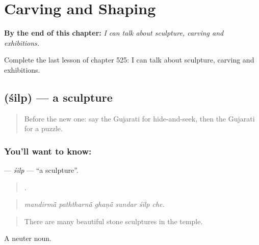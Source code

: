 
\chapter{Carving and Shaping}
\label{ch:gu-carving-and-shaping}

\begin{chapteropening}
\textbf{By the end of this chapter:} \emph{I can talk about sculpture, carving and exhibitions.}

Complete the last lesson of chapter 525: I can talk about sculpture, carving and exhibitions.
\end{chapteropening}

\section[\texorpdfstring{\gu{શિલ્પ} (śilp)}{શિલ્પ (śilp)}]{ (śilp) — a sculpture}

\label{lesson:GU-C525-silp}



\begin{quote}
Before the new one: say the Gujarati for hide-and-seek, then the Gujarati for a puzzle.
\end{quote}

\subsection*{You'll want to know: }
\textbf{} — \emph{śilp} — \textquotedblleft{}a sculpture\textquotedblright{}.

\begin{quote}
     .
\end{quote}

\begin{quote}
\emph{mandirmā̃ paththarnā̃ ghaṇā̃ sundar śilp che.}
\end{quote}

\begin{quote}
There are many beautiful stone sculptures in the temple.
\end{quote}

A neuter noun.

